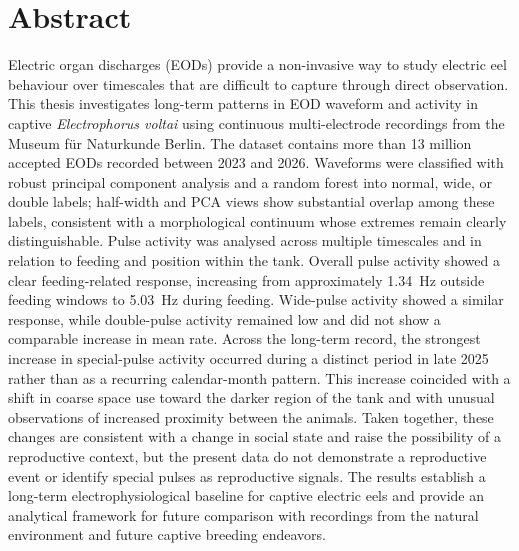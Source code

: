 \section{Abstract}

Electric organ discharges (EODs) provide a non-invasive way to study electric eel behaviour over timescales that are difficult to capture through direct observation. 
This thesis investigates long-term patterns in EOD waveform and activity in captive \textit{Electrophorus voltai} using continuous multi-electrode recordings from the Museum für Naturkunde Berlin. 
The dataset contains more than 13 million accepted EODs recorded between 2023 and 2026. 
Waveforms were classified with robust principal component analysis and a random forest into normal, wide, or double labels; half-width and PCA views show substantial overlap among these labels, consistent with a morphological continuum whose extremes remain clearly distinguishable. 
Pulse activity was analysed across multiple timescales and in relation to feeding and position within the tank. 
Overall pulse activity showed a clear feeding-related response, increasing from approximately 1.34~Hz outside feeding windows to 5.03~Hz during feeding. 
Wide-pulse activity showed a similar response, while double-pulse activity remained low and did not show a comparable increase in mean rate. 
Across the long-term record, the strongest increase in special-pulse activity occurred during a distinct period in late 2025 rather than as a recurring calendar-month pattern. 
This increase coincided with a shift in coarse space use toward the darker region of the tank and with unusual observations of increased proximity between the animals. 
Taken together, these changes are consistent with a change in social state and raise the possibility of a reproductive context, but the present data do not demonstrate a reproductive event or identify special pulses as reproductive signals. 
The results establish a long-term electrophysiological baseline for captive electric eels and provide an analytical framework for future comparison with recordings from the natural environment and future captive breeding endeavors.

\newpage
